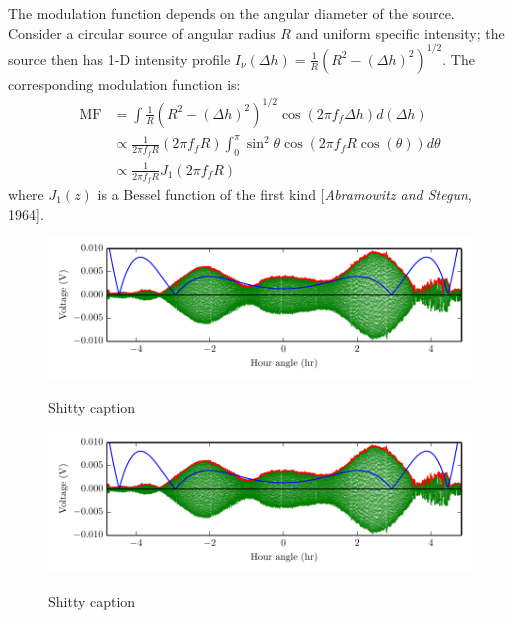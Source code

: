 \documentclass[10pt]{article}
\begin{document}
The modulation function depends on the angular diameter of the source.  Consider a circular source of angular radius $R$ and uniform specific intensity; the source then has 1-D intensity profile $I_\nu(\Delta h) = \frac{1}{R} \left( R^2 - (\Delta h)^2 \right)^{1/2}$.  The corresponding modulation function is:
\begin{align*}
    \mathrm{MF} &= \int \frac{1}{R} \left( R^2 - (\Delta h)^2 \right)^{1/2} \cos(2\pi f_f \Delta h) d(\Delta h) \\
                &\propto \frac{1}{2\pi f_f R} \left(2\pi f_f R\right)
                         \int_0^\pi \sin^2 \theta \cos\left(2\pi f_f R \cos(\theta)\right) d\theta \\
                &\propto \frac{1}{2\pi f_f R} J_1 \left(2\pi f_f R \right)
\end{align*}
where $J_1(z)$ is a Bessel function of the first kind [\textit{Abramowitz and Stegun}, 1964].

\begin{figure}[!ht]
    \centering
    \includegraphics[scale=1]{plots_fitting/sun_fringes_envelopes.pdf} \\
    \caption{Shitty caption}
	\label{fig:sunFringes}
\end{figure}

\begin{figure}[!ht]
    \centering
    \includegraphics[scale=1]{plots_fitting/sun_fringes_envelopes.pdf} \\
    \caption{Shitty caption}
	\label{fig:sunFringes}
\end{figure}

\end{document}
